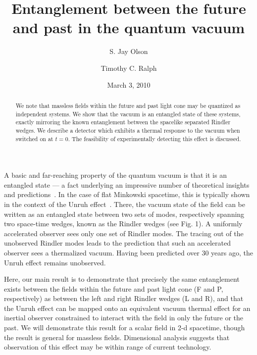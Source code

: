 \documentclass[aps,prl,showpacs,12pt]{revtex4}
\begin{document}


\title{Entanglement between the future and past in the quantum vacuum}

\author{S. Jay Olson}
 \author{Timothy C. Ralph}

\date{March 3, 2010}

\begin{abstract}
We note that massless fields within the future and past light cone may be quantized as independent systems.  We show that the vacuum is an entangled state of these systems, exactly mirroring the known entanglement between the spacelike separated Rindler wedges.   We describe a detector which exhibits a thermal response to the vacuum when switched on at $t=0$.  The feasibility of experimentally detecting this effect is discussed.

\end{abstract}

\maketitle

A basic and far-reaching property of the quantum vacuum is that it is an entangled state \---- a fact underlying an impressive number of theoretical insights and predictions~\cite{birrell1}.  In the case of flat Minkowski spacetime, this is typically shown in the context of the Unruh effect~\cite{unruh1, crispino1}.  There, the vacuum state of the field can be written as an entangled state between two sets of modes, respectively spanning two space-time wedges, known as the Rindler wedges (see Fig. 1).  A uniformly accelerated observer sees only one set of Rindler modes.  The tracing out of the unobserved Rindler modes leads to the prediction that such an accelerated observer sees a thermalized vacuum.  Having been predicted over 30 years ago, the Unruh effect remains unobserved.

Here, our main result is to demonstrate that precisely the same entanglement exists between the fields within the future and past light cone (F and P, respectively) as between the left and right Rindler wedges (L and R), and that the Unruh effect can be mapped onto an equivalent vacuum thermal effect for an inertial observer constrained to interact with the field in only the future or the past.  We will demonstrate this result for a scalar field in 2-d spacetime, though the result is general for massless fields.  Dimensional analysis suggests that observation of this effect may be within range of current technology.
\end{document}
